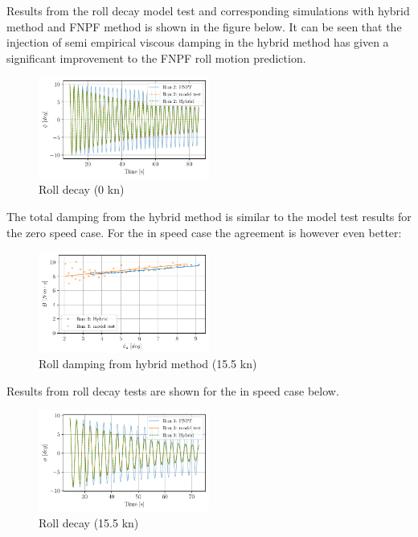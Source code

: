     Results from the roll decay model test and corresponding simulations
with hybrid method and FNPF method is shown in the figure below. It can
be seen that the injection of semi empirical viscous damping in the
hybrid method has given a significant improvement to the FNPF roll
motion prediction.

    \begin{figure}[H]
        \begin{center}\includegraphics[width = 0.5\textwidth]{figures/hybrid_0_time.pdf}\end{center}
        \vspace{-1cm}
        \caption{Roll decay (0 kn)}
        \label{fig:hybrid_0_time}
    \end{figure}
    
    The total damping from the hybrid method is similar to the model test
results for the zero speed case. For the in speed case the agreement is
however even better:

    \begin{figure}[H]
        \begin{center}\includegraphics[width = 0.5\textwidth]{figures/hybrid_speed_amplitudes.pdf}\end{center}
        \vspace{-1cm}
        \caption{Roll damping from hybrid method (15.5 kn)}
        \label{fig:hybrid_speed_amplitudes}
    \end{figure}
    
    Results from roll decay tests are shown for the in speed case below.

    \begin{figure}[H]
        \begin{center}\includegraphics[width = 0.5\textwidth]{figures/hybrid_speed_time.pdf}\end{center}
        \vspace{-1cm}
        \caption{Roll decay (15.5 kn)}
        \label{fig:hybrid_speed_time}
    \end{figure}
    
